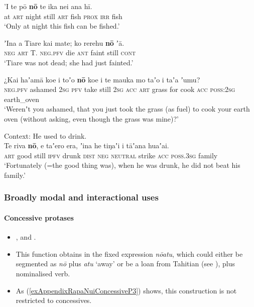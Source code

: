 \begin{exe}
	\ex\label{exAppendixRapaNuiRestrictive1}
	\gll 'I te pō \textbf{nō} te ika nei ana hī.\\
	at \textsc{art} night still \textsc{art} fish \textsc{prox} \textsc{irr} fish\\
	\glt \lq Only at night this fish can be fished.\rq{ }\parencite[267]{Kieviet2017}

	\ex\label{exAppendixRapaNuiRestrictive2}
	\gll ʼIna a Tiare kai mate; ko rerehu \textbf{nō} ʼā.\\
	\textsc{neg} \textsc{art} T. \textsc{neg}.\textsc{pfv} die \textsc{ant} faint still \textsc{cont}\\
	\glt \lq Tiare was not dead; she had just fainted.' \parencite[343]{Kieviet2017}
	
	\ex\label{exAppendixRapaNuiRestrictive4}
	\gll ¿Kai haʼamā koe i toʼo \textbf{nō} koe i te mauka mo taʼo i taʼa ʼumu?\\
	\phantom{¿}\textsc{neg}.\textsc{pfv} ashamed 2\textsc{sg} \textsc{pfv} take still 2\textsc{sg} \textsc{acc} \textsc{art} grass for cook \textsc{acc} \textsc{poss}:2\textsc{sg} earth\_oven\\
	\glt \lq Werenʼt you ashamed, that you just took the grass (as fuel) to cook your earth oven (without asking, even though the grass was mine)?' \parencite[343]{Kieviet2017}
	
	\ex\label{exAppendixRapaNuiRestrictive5}
	Context: He used to drink.\\
	\gll Te riva \textbf{nō}, e taʼero era, ʼina he tiŋaʼi i tāʼana huaʼai.\\
	\textsc{art} good still \textsc{ipfv} drunk \textsc{dist} \textsc{neg} \textsc{neutral} strike \textsc{acc} \textsc{poss}.3\textsc{sg} family\\
	\glt \lq Fortunately (=the good thing was), when he was drunk, he did not beat his family.' \parencite[268]{Kieviet2017}
\end{exe}	
\largerpage[2]
\subsubsection{Broadly modal and interactional uses}
\paragraph{Concessive protases}\label{appendixRapaNuiConcessiveAntecedent}
\begin{itemize}
	\item \textcite[59]{duFeu1996}, and \textcite[570]{Kieviet2017}.
	\item This function obtains in the fixed expression \textit{nōatu}, which could either be segmented as \textit{nō} plus \textit{atu} \lq away' or be a loan from Tahitian (see \cite[570 fn34]{Kieviet2017}), plus nominalised verb.
	\item As (\ref{exAppendixRapaNuiConcessiveP3}) shows, this construction is not restricted to concessives.
\end{itemize}


